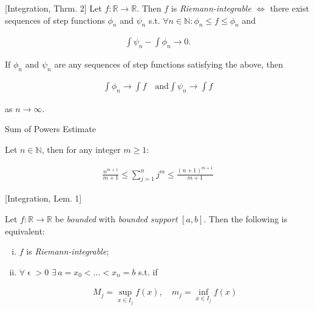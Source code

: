 \documentclass[10pt]{article} %
\renewcommand{\leq}{\leqslant}
\renewcommand{\geq}{\geqslant}
\begin{document}
\begin{multicols}{3}
\begin{theorem}{[Integration, Thrm. 2]}{}
    Let $f: \mathbb{R} \to \mathbb{R}$. Then $f$ is \emph{Riemann-integrable} $\Leftrightarrow$ there exist sequences of step functions $\phi_n$ and $\psi_n$ s.t. $\forall n \in \mathbb{N}: \phi_n \leq f \leq \phi_n$ and

        \begin{align*}
            \int \psi_n - \int \phi_n \to 0.
        \end{align*}

    If $\phi_n$ and $\psi_n$ are any sequences of step functions satisfying the above, then

        \begin{align*}
            \int \phi_n \to \int f \quad \textrm{and} \int \psi_n \to \int f
        \end{align*}

    as $n \to \infty$.

\end{theorem}

\begin{exercise}{}{Sum of Powers Estimate}

    Let $n \in \mathbb{N}$, then for any integer $m \geq 1$:

        \begin{align*}
            \frac{n^{m + 1}}{m + 1} \leq \sum_{j = 1}^n j^m \leq \frac{(n + 1)^{m + 1}}{m + 1}
        \end{align*}

\end{exercise}

\begin{lemma}{[Integration, Lem. 1]}{}

    Let $f: \mathbb{R} \to \mathbb{R}$ be \emph{bounded} with \emph{bounded support} $[a,b]$. Then the following is equivalent:

        \begin{enumerate}[(i)]
            \setlength{\parskip}{0em}
            \item $f$ is \emph{Riemann-integrable};
            \item $\forall \upvarepsilon > 0$ $\exists\, a = x_0 < \hdots < x_n = b$ s.t. if

                \begin{align*}
                    M_j = \sup_{x \in I_j} f(x), \quad m_j = \inf_{x \in I_j} f(x) 
                \end{align*}


\end{enumerate}
\end{lemma}
\end{multicols}
\end{document}
